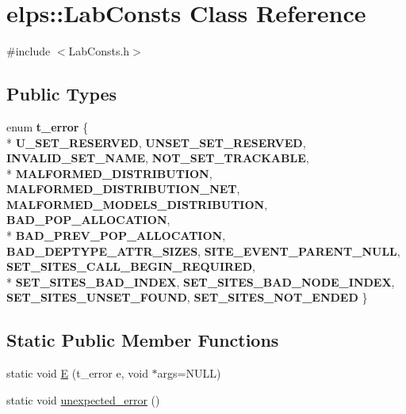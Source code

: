 \hypertarget{classelps_1_1_lab_consts}{\section{elps\+:\+:Lab\+Consts Class Reference}
\label{classelps_1_1_lab_consts}
}


{\ttfamily \#include $<$Lab\+Consts.\+h$>$}

\subsection*{Public Types}
\begin{DoxyCompactItemize}
\item 
\hypertarget{classelps_1_1_lab_consts_a4660206f0901074dce3fc17f2fbe3c17}{enum {\bfseries t\+\_\+error} \{ \\*
{\bfseries U\+\_\+\+S\+E\+T\+\_\+\+R\+E\+S\+E\+R\+V\+E\+D}, 
{\bfseries U\+N\+S\+E\+T\+\_\+\+S\+E\+T\+\_\+\+R\+E\+S\+E\+R\+V\+E\+D}, 
{\bfseries I\+N\+V\+A\+L\+I\+D\+\_\+\+S\+E\+T\+\_\+\+N\+A\+M\+E}, 
{\bfseries N\+O\+T\+\_\+\+S\+E\+T\+\_\+\+T\+R\+A\+C\+K\+A\+B\+L\+E}, 
\\*
{\bfseries M\+A\+L\+F\+O\+R\+M\+E\+D\+\_\+\+D\+I\+S\+T\+R\+I\+B\+U\+T\+I\+O\+N}, 
{\bfseries M\+A\+L\+F\+O\+R\+M\+E\+D\+\_\+\+D\+I\+S\+T\+R\+I\+B\+U\+T\+I\+O\+N\+\_\+\+N\+E\+T}, 
{\bfseries M\+A\+L\+F\+O\+R\+M\+E\+D\+\_\+\+M\+O\+D\+E\+L\+S\+\_\+\+D\+I\+S\+T\+R\+I\+B\+U\+T\+I\+O\+N}, 
{\bfseries B\+A\+D\+\_\+\+P\+O\+P\+\_\+\+A\+L\+L\+O\+C\+A\+T\+I\+O\+N}, 
\\*
{\bfseries B\+A\+D\+\_\+\+P\+R\+E\+V\+\_\+\+P\+O\+P\+\_\+\+A\+L\+L\+O\+C\+A\+T\+I\+O\+N}, 
{\bfseries B\+A\+D\+\_\+\+D\+E\+P\+T\+Y\+P\+E\+\_\+\+A\+T\+T\+R\+\_\+\+S\+I\+Z\+E\+S}, 
{\bfseries S\+I\+T\+E\+\_\+\+E\+V\+E\+N\+T\+\_\+\+P\+A\+R\+E\+N\+T\+\_\+\+N\+U\+L\+L}, 
{\bfseries S\+E\+T\+\_\+\+S\+I\+T\+E\+S\+\_\+\+C\+A\+L\+L\+\_\+\+B\+E\+G\+I\+N\+\_\+\+R\+E\+Q\+U\+I\+R\+E\+D}, 
\\*
{\bfseries S\+E\+T\+\_\+\+S\+I\+T\+E\+S\+\_\+\+B\+A\+D\+\_\+\+I\+N\+D\+E\+X}, 
{\bfseries S\+E\+T\+\_\+\+S\+I\+T\+E\+S\+\_\+\+B\+A\+D\+\_\+\+N\+O\+D\+E\+\_\+\+I\+N\+D\+E\+X}, 
{\bfseries S\+E\+T\+\_\+\+S\+I\+T\+E\+S\+\_\+\+U\+N\+S\+E\+T\+\_\+\+F\+O\+U\+N\+D}, 
{\bfseries S\+E\+T\+\_\+\+S\+I\+T\+E\+S\+\_\+\+N\+O\+T\+\_\+\+E\+N\+D\+E\+D}
 \}}\label{classelps_1_1_lab_consts_a4660206f0901074dce3fc17f2fbe3c17}

\end{DoxyCompactItemize}
\subsection*{Static Public Member Functions}
\begin{DoxyCompactItemize}
\item 
static void \hyperlink{classelps_1_1_lab_consts_a1a402f6065512ba3400151c870b4daca}{E} (t\+\_\+error e, void $\ast$args=N\+U\+L\+L)
\item 
static void \hyperlink{classelps_1_1_lab_consts_a766d810d7e33b099eec25a7e29c22e57}{unexpected\+\_\+error} ()
\end{DoxyCompactItemize}



